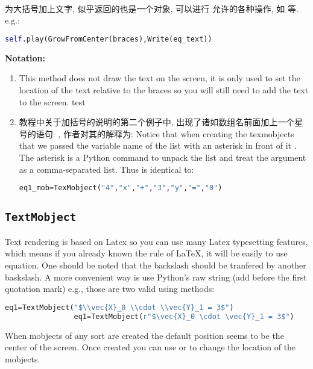         \paragraph{ \\}
            \hspace*{2em}为大括号加上文字, 似乎返回的也是一个对象, 可以进行  允许的各种操作, 如  等. e.g.:
                \begin{lstlisting}[language = {Python}, gobble = 20]
                    self.play(GrowFromCenter(braces),Write(eq_text))
                \end{lstlisting}

            \textbf{Notation:}
                \begin{enumerate}
                    \item This method does not draw the text on the screen, it is only used to set the location of the text relative to the braces so you will still need to add the text to the screen. test
                    \item 教程中关于加括号的说明的第二个例子中, 出现了诸如数组名前面加上一个星号的语句: , 作者对其的解释为: Notice that when creating the texmobjects that we passed the variable name of the list with an asterisk in front of it . The asterisk is a Python command to unpack the list and treat the argument as a comma-separated list. Thus  is identical to:
                        \begin{lstlisting}[language = {Python}, gobble = 28]
                            eq1_mob=TexMobject("4","x","+","3","y","=","0")
                        \end{lstlisting}
                \end{enumerate}


    \subsection{\texttt{TextMobject}}
        \hspace*{2em}Text rendering is based on Latex so you can use many Latex typesetting features, which means if you already known the rule of \LaTeX, it will be easily to use equation. One should be noted that the backslash should be tranfered by another baskslash. A more convenient way is use Python's raw string (add  before the first quotation mark) e.g., those are two valid using methods:
            \begin{lstlisting}[language = {Python}, gobble = 16]
                eq1=TextMobject("$\\vec{X}_0 \\cdot \\vec{Y}_1 = 3$")
                eq1=TextMobject(r"$\vec{X}_0 \cdot \vec{Y}_1 = 3$")
            \end{lstlisting}
        \hspace*{2em}When mobjects of any sort are created the default position seems to be the center of the screen. Once created you can use  or  to change the location of the mobjects.

